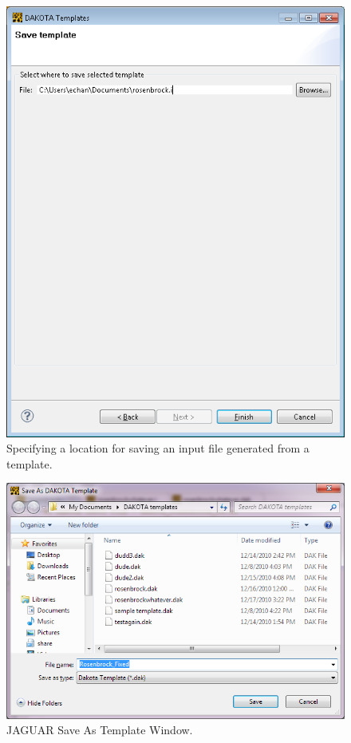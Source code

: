 \begin{figure}
  \centering
  \includegraphics[scale=0.6]{images/2_1jag_template2}
  \caption{Specifying a location for saving an input file generated
    from a template.}
  \label{fig:input:jag_template2}
\end{figure}
\begin{figure}[htbp]
  \centering
  \includegraphics[scale=0.6]{images/9SaveAsTemplate}
  \caption{JAGUAR Save As Template Window.}
  \label{fig:input:9SaveAsTemplate}
\end{figure}

